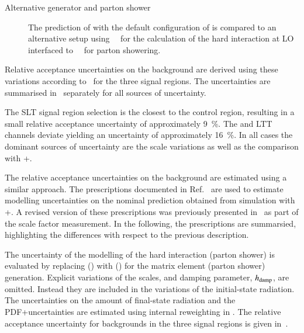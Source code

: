 \begin{description}
\item[Alternative generator and parton shower] The prediction of
  \Zjets with the default configuration of \SHERPA[2.2.1] is compared
  to an alternative setup using~\MGNLO[2.2.2]~\cite{Alwall:2014hca}
  for the calculation of the hard interaction at LO interfaced
  to~\PYTHIA[8.186]~\cite{Sjostrand:2007gs} for parton showering.

\end{description}
Relative acceptance uncertainties on the \ZHF background are derived
using these variations according
to~ for the three signal
regions. The uncertainties are summarised
in~ separately for all sources of
uncertainty.

The \lephad SLT signal region selection is the closest to the \ZHF
control region, resulting in a small relative acceptance uncertainty
of approximately \SI{9}{\percent}. The \hadhad and \lephad LTT
channels deviate yielding an uncertainty of approximately
\SI{16}{\percent}. In all cases the dominant sources of uncertainty
are the scale variations as well as the comparison with
\MGNLO+\PYTHIA[8].

The relative acceptance uncertainties on the \ttbar background are
estimated using a similar approach. The prescriptions documented in
Ref.~\cite{ATL-PHYS-PUB-2020-023} are used to estimate modelling
uncertainties on the nominal prediction obtained from simulation with
\POWHEGBOX[v2]+\PYTHIA[8]. A revised version of these prescriptions
was previously presented in~ as part
of the \ttbarFakes scale factor measurement. In the following, the
prescriptions are summarsied, highlighting the differences with
respect to the previous description.

The uncertainty of the modelling of the hard interaction (parton
shower) is evaluated by replacing \POWHEGBOX[v2] (\PYTHIA[8]) with
\MGNLO (\HERWIG[7]) for the matrix element (parton shower)
generation. Explicit variations of the scales, and \PYTHIA[8] damping
parameter, $h_\mathrm{damp}$, are omitted. Instead they are included in the
variations of the initial-state radiation. The uncertainties on the
amount of final-state radiation and the PDF+\alphas uncertainties are
estimated using internal reweighting in \PYTHIA[8]. The relative
acceptance uncertainty for \ttbar backgrounds in the three signal
regions is given in~.

